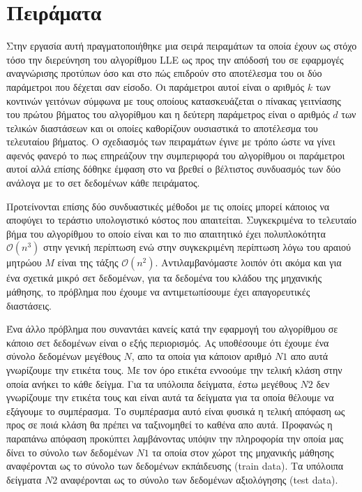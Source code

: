 
\chapter{Πειράματα}
\par
Στην εργασία αυτή πραγματοποιήθηκε μια σειρά πειραμάτων τα οποία έχουν ως στόχο τόσο την διερεύνηση του αλγορίθμου \textlatin{LLE} ως προς την απόδοσή του σε εφαρμογές αναγνώρισης προτύπων όσο και στο πώς επιδρούν στο αποτέλεσμα του οι δύο παράμετροι που δέχεται σαν είσοδο. Οι παράμετροι αυτοί είναι ο αριθμός $k$ των κοντινών γειτόνων σύμφωνα με τους οποίους κατασκευάζεται ο πίνακας γειτνίασης του πρώτου βήματος του αλγορίθμου και η δεύτερη παράμετρος είναι ο αριθμός $d$ των τελικών διαστάσεων και οι οποίες καθορίζουν ουσιαστικά το αποτέλεσμα του τελευταίου βήματος. Ο σχεδιασμός των πειραμάτων έγινε με τρόπο ώστε να γίνει αφενός φανερό το πως επηρεάζουν την συμπεριφορά του αλγορίθμου οι παράμετροι αυτοί αλλά επίσης δόθηκε έμφαση στο να βρεθεί ο βέλτιστος συνδυασμός των δύο ανάλογα με το σετ δεδομένων κάθε πειράματος. 
\par
Προτείνονται επίσης δύο συνδυαστικές μέθοδοι με τις οποίες μπορεί κάποιος να αποφύγει το τεράστιο υπολογιστικό κόστος που απαιτείται. Συγκεκριμένα το τελευταίο βήμα του αλγορίθμου το οποίο είναι και το πιο απαιτητικό έχει πολυπλοκότητα $\mathcal{O}(n^{3})$ στην γενική περίπτωση ενώ στην συγκεκριμένη περίπτωση λόγω του αραιού μητρώου $M$ είναι της τάξης $\mathcal{O}(n^{2})$. Αντιλαμβανόμαστε λοιπόν ότι ακόμα και για ένα σχετικά μικρό σετ δεδομένων, για τα δεδομένα του κλάδου της μηχανικής μάθησης, το πρόβλημα που έχουμε να αντιμετωπίσουμε έχει απαγορευτικές διαστάσεις. 
\par
Ένα άλλο πρόβλημα που συναντάει κανείς κατά την εφαρμογή του αλγορίθμου σε κάποιο σετ δεδομένων είναι ο εξής περιορισμός. Ας υποθέσουμε ότι έχουμε ένα σύνολο δεδομένων μεγέθους $N$, απο τα οποία για κάποιον αριθμό $N1$ απο αυτά γνωρίζουμε την ετικέτα τους. Με τον όρο ετικέτα εννοούμε την τελική κλάση στην οποία ανήκει το κάθε δείγμα. Για τα υπόλοιπα δείγματα, έστω μεγέθους $N2$ δεν γνωρίζουμε την ετικέτα τους και είναι αυτά τα δείγματα για τα οποία θέλουμε να εξάγουμε το συμπέρασμα. Το συμπέρασμα αυτό είναι φυσικά η τελική απόφαση ως προς σε ποιά κλάση θα πρέπει να ταξινομηθεί το καθένα απο αυτά. Προφανώς η παραπάνω απόφαση προκύπτει λαμβάνοντας υπόψιν την πληροφορία την οποία μας δίνει το σύνολο των δεδομένων $N1$ τα οποία στον χώροτ της μηχανικής μάθησης αναφέρονται ως το σύνολο των δεδομένων εκπάιδευσης \textlatin{(train data)}. Τα υπόλοιπα δείγματα $N2$ αναφέρονται ως το σύνολο των δεδομένων αξιολόγησης \textlatin{(test data)}.
